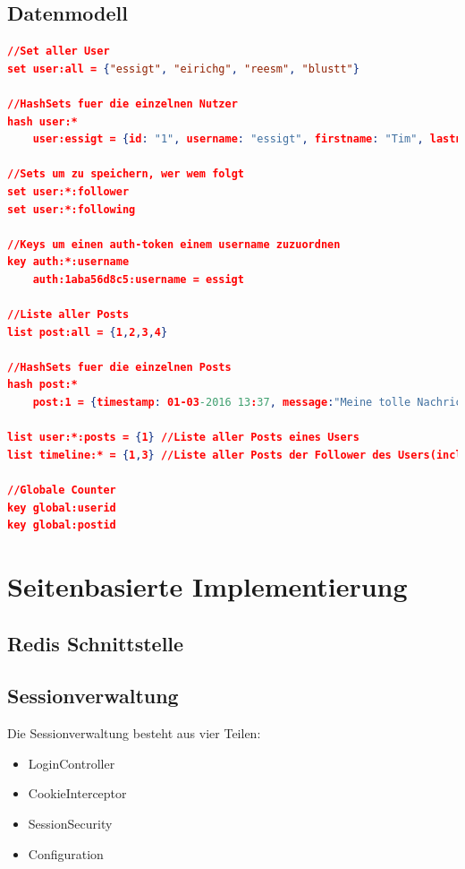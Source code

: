 \documentclass[
    a4paper
]{scrreprt}
\begin{document}
    \section{Datenmodell}
        \begin{lstlisting}[language=json]
//Set aller User
set user:all = {"essigt", "eirichg", "reesm", "blustt"}

//HashSets fuer die einzelnen Nutzer
hash user:*
    user:essigt = {id: "1", username: "essigt", firstname: "Tim", lastname: "Essig", password: "xyz", auth: "1aba56d8c5"}

//Sets um zu speichern, wer wem folgt
set user:*:follower
set user:*:following

//Keys um einen auth-token einem username zuzuordnen
key auth:*:username
    auth:1aba56d8c5:username = essigt

//Liste aller Posts
list post:all = {1,2,3,4}

//HashSets fuer die einzelnen Posts
hash post:*
    post:1 = {timestamp: 01-03-2016 13:37, message:"Meine tolle Nachricht", user:"essigt"}

list user:*:posts = {1} //Liste aller Posts eines Users
list timeline:* = {1,3} //Liste aller Posts der Follower des Users(incl. seiner eigenen)

//Globale Counter
key global:userid
key global:postid
        \end{lstlisting}


    \chapter{Seitenbasierte Implementierung}
    \section{Redis Schnittstelle}

    \section{Sessionverwaltung}
    Die Sessionverwaltung besteht aus vier Teilen:
    	\begin{itemize} 
    	\item LoginController
    	\item CookieInterceptor
    	\item SessionSecurity
    	\item Configuration
    \end{itemize}
\end{document}
